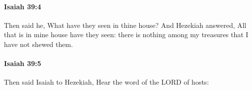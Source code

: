 		\paragraph{Isaiah 39:4} %
			\label{ISAIAH-39-4}

			Then said he, What have they seen in thine house? And Hezekiah answered, All that is in mine house have they seen: there is nothing among my treasures that I have not shewed them.


		\paragraph{Isaiah 39:5} %
			\label{ISAIAH-39-5}

			Then said Isaiah to Hezekiah, Hear the word of the LORD of hosts:


